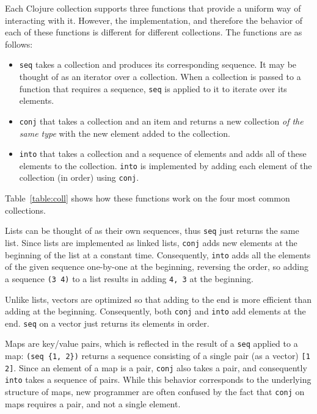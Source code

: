 \documentclass[submission,copyright,creativecommons]{eptcs}
\newcommand{\clocode}[1]{{\tt {#1}}}
\begin{document}
Each Clojure collection supports three functions that provide a uniform way of interacting with it. However, the implementation, and therefore the behavior of each of these functions is different for different collections. The functions are as follows:
\begin{itemize}
\item \clocode{seq} takes a collection and produces its corresponding sequence. It may be thought of as an iterator over a collection. When a collection is passed to a function that requires a sequence, \clocode{seq} is applied to it to iterate over its elements. 
\item \clocode{conj} that takes a collection and an item and returns a new collection {\it of the same type} with the new element added to the collection. 
\item \clocode{into} that takes a collection and a sequence of elements and adds all of these elements to the collection. \clocode{into} is implemented by adding each element of the collection (in order) using \clocode{conj}. 
\end{itemize}
Table~\ref{table:coll} shows how these functions work on the four most common collections. 

Lists can be thought of as their own sequences, thus \clocode{seq} just returns the same list. 
Since lists are implemented as linked lists, \clocode{conj} adds new elements at the beginning of the list at a constant time. Consequently, \clocode{into} adds all the elements of the given sequence one-by-one at the beginning, reversing the order, so adding a sequence \clocode{(3 4)} to a list results in adding \clocode{4, 3} at the beginning. 

Unlike lists, vectors are optimized so that adding to the end is more efficient than adding at the beginning. Consequently, both  \clocode{conj} and \clocode{into} add elements at the end. \clocode{seq} on a vector just returns its elements in order. 

Maps are key/value pairs, which is reflected in the result of a \clocode{seq} applied to a map: \clocode{(seq \{1, 2\})} returns a sequence consisting of a single pair (as a vector) \clocode{[1 2]}. Since an element of a map is a pair, \clocode{conj} also takes a pair, and consequently \clocode{into} takes a sequence of pairs. While this behavior corresponds to the underlying structure of maps, new programmer are often confused by the fact that \clocode{conj} on maps requires a pair, and not a single element. 
\end{document}
